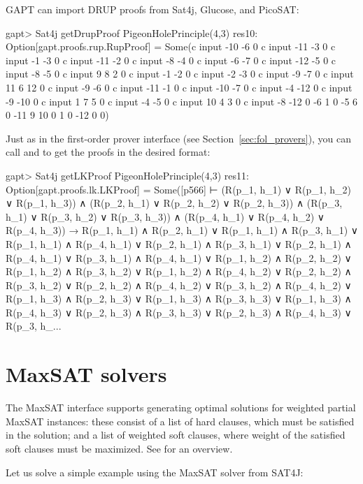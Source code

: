 \documentclass[a4paper,11pt]{book}
\newcommand{\cli}[1]{{\ttfamily {#1}}}
\begin{document}
GAPT can import DRUP proofs from Sat4j, Glucose, and PicoSAT:
\begin{clilisting}
gapt> Sat4j getDrupProof PigeonHolePrinciple(4,3)
res10: Option[gapt.proofs.rup.RupProof] =
Some(c input -10 -6 0
c input -11 -3 0
c input -1 -3 0
c input -11 -2 0
c input -8 -4 0
c input -6 -7 0
c input -12 -5 0
c input -8 -5 0
c input 9 8 2 0
c input -1 -2 0
c input -2 -3 0
c input -9 -7 0
c input 11 6 12 0
c input -9 -6 0
c input -11 -1 0
c input -10 -7 0
c input -4 -12 0
c input -9 -10 0
c input 1 7 5 0
c input -4 -5 0
c input 10 4 3 0
c input -8 -12 0
-6 1 0
-5 6 0
-11 9 10 0
1 0
-12 0
 0)

\end{clilisting}

Just as in the first-order prover interface (see Section~\ref{sec:fol_provers}), you can call
\cli{getResolutionProof} and \cli{getLKProof} to get the proofs in the desired
format:
\begin{clilisting}
gapt> Sat4j getLKProof PigeonHolePrinciple(4,3)
res11: Option[gapt.proofs.lk.LKProof] =
Some([p566]
⊢
(R(p_1, h_1) ∨ R(p_1, h_2) ∨ R(p_1, h_3)) ∧
    (R(p_2, h_1) ∨ R(p_2, h_2) ∨ R(p_2, h_3)) ∧
    (R(p_3, h_1) ∨ R(p_3, h_2) ∨ R(p_3, h_3)) ∧
    (R(p_4, h_1) ∨ R(p_4, h_2) ∨ R(p_4, h_3)) →
  R(p_1, h_1) ∧ R(p_2, h_1) ∨
    R(p_1, h_1) ∧ R(p_3, h_1) ∨
    R(p_1, h_1) ∧ R(p_4, h_1) ∨
    R(p_2, h_1) ∧ R(p_3, h_1) ∨
    R(p_2, h_1) ∧ R(p_4, h_1) ∨
    R(p_3, h_1) ∧ R(p_4, h_1) ∨
    R(p_1, h_2) ∧ R(p_2, h_2) ∨
    R(p_1, h_2) ∧ R(p_3, h_2) ∨
    R(p_1, h_2) ∧ R(p_4, h_2) ∨
    R(p_2, h_2) ∧ R(p_3, h_2) ∨
    R(p_2, h_2) ∧ R(p_4, h_2) ∨
    R(p_3, h_2) ∧ R(p_4, h_2) ∨
    R(p_1, h_3) ∧ R(p_2, h_3) ∨
    R(p_1, h_3) ∧ R(p_3, h_3) ∨
    R(p_1, h_3) ∧ R(p_4, h_3) ∨
    R(p_2, h_3) ∧ R(p_3, h_3) ∨
    R(p_2, h_3) ∧ R(p_4, h_3) ∨
    R(p_3, h_...

\end{clilisting}

\section{MaxSAT solvers}

The MaxSAT interface supports generating optimal solutions for weighted partial
MaxSAT instances: these consist of a list of hard clauses, which must be
satisfied in the solution; and a list of weighted soft clauses, where weight of
the satisfied soft clauses must be maximized.  See \cite{Argelich2008First}
for an overview.

Let us solve a simple example using the MaxSAT solver from SAT4J:
\end{document}
